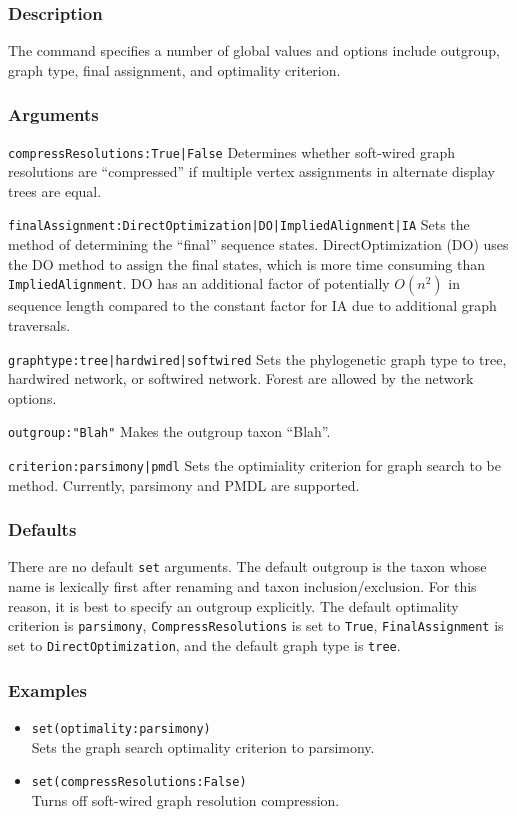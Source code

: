 \documentclass[11pt]{article}
\begin{document}
		\subsubsection{Description}
		The command specifies a number of global values and options include outgroup, graph type, final assignment, and optimality criterion.
		\subsubsection{Arguments}
			\smallskip
			\noindent \texttt{compressResolutions:True|False} Determines whether soft-wired graph resolutions are ``compressed''
			if multiple vertex assignments in alternate display trees are equal.
			
			\smallskip
			\noindent \texttt{finalAssignment:DirectOptimization|DO|ImpliedAlignment|IA} Sets the method of determining the ``final''
			sequence states. DirectOptimization (DO) uses the DO method to assign the final states, which is more time consuming 
			than \texttt{ImpliedAlignment}. DO has an additional factor of potentially $O(n^2)$ in sequence length compared to the constant factor for IA due to additional graph traversals.
			
			\smallskip
			\noindent \texttt{graphtype:tree|hardwired|softwired} Sets the phylogenetic graph type to tree, hardwired network, or softwired network.  Forest are allowed 
			by the network options.
			
			\smallskip
			\noindent \texttt{outgroup:"Blah"} Makes the outgroup taxon ``Blah''. 
			
			\smallskip
			\noindent \texttt{criterion:parsimony|pmdl} Sets the optimiality criterion for graph search to be method.  Currently, parsimony and PMDL \citep{WheelerandVaron2022} are supported.
				
		\subsubsection{Defaults} 
		There are no default \texttt{set} arguments.  The default outgroup is the taxon whose name  is lexically first after
		renaming and taxon inclusion/exclusion. For this reason, it is best to specify an outgroup explicitly.
		The default optimality criterion is \texttt{parsimony}, \texttt{CompressResolutions} is set to \texttt{True}, \texttt{FinalAssignment} is set to \texttt{DirectOptimization}, and the default graph type is \texttt{tree}.
		\subsubsection{Examples}
			\begin{itemize}
					\item{\texttt{set(optimality:parsimony)}\\Sets the graph search optimality criterion to parsimony.}
					\item{\texttt{set(compressResolutions:False)}\\Turns off soft-wired graph resolution compression.}
			\end{itemize}
		
\end{document}
